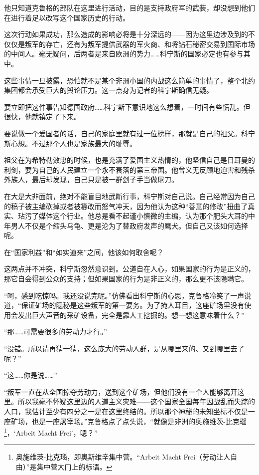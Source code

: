 他只知道克鲁格的部队在这里进行活动，目的是支持政府军的武装，却没想到他们在进行着足以改写这个国家历史的行动。

这次行动如果成功，那么造成的影响必将是十分深远的——因为这里边涉及到的不仅仅是叛军的存亡，还有为叛军提供武器的军火商、和将钻石秘密交易到国际市场的中间人。毫无疑问，后两者是来自欧洲的势力……科宁斯的国家必定也有参与其中。

这些事情一旦披露，恐怕就不是某个非洲小国的内战这么简单的事情了，整个北约集团都会承受巨大的舆论压力。这一点身为记者的科宁斯确信无疑。

要立即把这件事告知德国政府……科宁斯下意识地这么想着，一时间有些慌乱。但很快，他就镇定了下来。

要说做一个爱国者的话，自己的家庭里就有过一位榜样，那就是自己的祖父。科宁斯心想。不过那个人也是家族最大的耻辱。

祖父在为希特勒效忠的时候，也是充满了爱国主义热情的，他坚信自己是日耳曼的利剑，要为自己的人民建立一个永不衰落的第三帝国。他曾义无反顾地迫害和残杀外族人，最后却发现，自己只是被一群刽子手当做屠刀。

在大是大非面前，绝对不能盲目地武断行事，科宁斯对自己说。自己经常因为自己的稿子被主编砍掉或者被篡改而怒气冲天，因为他认为这种“善意的修改”扭曲了真实、玷污了媒体这个行业。他总是看不起谨小慎微的主编，认为那个肥头大耳的中年男人不仅是个缩头乌龟、更是沦为了替政府发声的鹰犬。但自己又该如何选择呢。

在“国家利益”和“如实道来”之间，他该如何取舍呢？

这两点并不冲突，科宁斯忽然意识到。公道自在人心，如果国家的行为是正义的，那它自会得到公众的支持；但如果国家的行为是非正义的，那么更不该隐瞒它。

“呵，感到吃惊吗。我还没说完呢。”仿佛看出科宁斯的心思，克鲁格冷笑了一声说道，“保证矿场的隐秘是这些叛军的第一要务。为了掩人耳目，这座矿场里没有使用会发出巨大声音的采矿设备，完全是靠人工挖掘的。想一想这意味着什么？”

“那……可需要很多的劳动力才行。”

“没错。所以请再猜一猜，这么庞大的劳动人群，是从哪里来的、又到哪里去了呢？”

“这……你是说……”

“叛军一直在从全国掠夺劳动力，送到这个矿场，但他们没有一个人能够离开这里。所以我毫不怀疑这里边的人道主义灾难——这个国家全国每年因战乱而失踪的人口，我估计至少有四分之一是在这里终结的。所以那个神秘的未知坐标不仅是一座矿场，也是一座屠宰场。”克鲁格点了点头说，“就像是非洲的奥施维茨-比克瑙\footnote{奥施维茨-比克瑙，即奥斯维辛集中营。“Arbeit Macht Frei（劳动让人自由）”是集中营大门上的标语。}，‘Arbeit Macht Frei’，嗯？”

